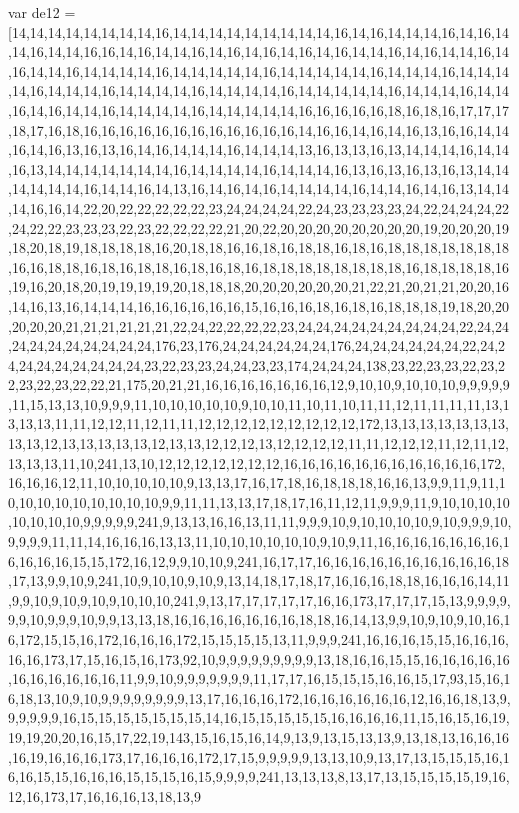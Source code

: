 var de12 = [14,14,14,14,14,14,14,14,16,14,14,14,14,14,14,14,14,14,16,14,16,14,14,14,16,14,16,14,14,16,14,14,16,16,14,16,14,14,16,14,16,14,16,14,16,14,16,14,14,16,14,16,14,14,16,14,16,14,14,16,14,14,14,14,16,14,14,14,14,14,16,14,14,14,14,14,16,14,14,14,16,14,14,14,14,16,14,14,14,16,14,14,14,14,16,14,14,14,14,16,14,14,14,14,14,16,14,14,14,16,14,14,16,14,16,14,14,16,14,14,14,14,16,14,14,14,14,14,16,16,16,16,16,18,16,18,16,17,17,17,18,17,16,18,16,16,16,16,16,16,16,16,16,16,16,16,14,16,16,14,16,14,16,13,16,16,14,14,16,14,16,13,16,13,16,14,16,14,14,14,16,14,14,14,13,16,13,13,16,13,14,14,14,16,14,14,16,13,14,14,14,14,14,14,14,16,14,14,14,14,16,14,14,14,16,13,16,13,16,13,16,13,14,14,14,14,14,14,16,14,14,16,14,13,16,14,16,14,16,14,14,14,14,16,14,14,16,14,16,13,14,14,14,16,16,14,22,20,22,22,22,22,22,23,24,24,24,24,22,24,23,23,23,23,24,22,24,24,24,22,24,22,22,23,23,23,22,23,22,22,22,22,21,20,22,20,20,20,20,20,20,20,20,19,20,20,20,19,18,20,18,19,18,18,18,18,16,20,18,18,16,16,18,16,18,18,16,18,16,18,18,18,18,18,18,18,16,16,18,18,16,18,16,18,18,16,18,16,18,16,18,18,18,18,18,18,18,18,16,18,18,18,18,16,19,16,20,18,20,19,19,19,19,20,18,18,18,20,20,20,20,20,20,21,22,21,20,21,21,20,20,16,14,16,13,16,14,14,14,16,16,16,16,16,16,15,16,16,16,18,16,18,16,18,18,18,19,18,20,20,20,20,20,21,21,21,21,21,21,22,24,22,22,22,22,23,24,24,24,24,24,24,24,24,24,22,24,24,24,24,24,24,24,24,24,24,176,23,176,24,24,24,24,24,24,176,24,24,24,24,24,24,22,24,24,24,24,24,24,24,24,24,23,22,23,23,24,24,23,23,174,24,24,24,138,23,22,23,23,22,23,22,23,22,23,22,22,21,175,20,21,21,16,16,16,16,16,16,16,12,9,10,10,9,10,10,10,9,9,9,9,9,11,15,13,13,10,9,9,9,11,10,10,10,10,10,9,10,10,11,10,11,10,11,11,12,11,11,11,11,13,13,13,13,11,11,12,12,11,12,11,11,12,12,12,12,12,12,12,12,12,172,13,13,13,13,13,13,13,13,13,12,13,13,13,13,13,12,13,13,12,12,12,13,12,12,12,12,11,11,12,12,12,11,12,11,12,13,13,13,11,10,241,13,10,12,12,12,12,12,12,12,16,16,16,16,16,16,16,16,16,16,16,172,16,16,16,12,11,10,10,10,10,10,9,13,13,17,16,17,18,16,18,18,18,16,16,13,9,9,11,9,11,10,10,10,10,10,10,10,10,10,9,9,11,11,13,13,17,18,17,16,11,12,11,9,9,9,11,9,10,10,10,10,10,10,10,10,9,9,9,9,9,241,9,13,13,16,16,13,11,11,9,9,9,10,9,10,10,10,10,9,10,9,9,9,10,9,9,9,9,11,11,14,16,16,16,13,13,11,10,10,10,10,10,10,9,10,9,11,16,16,16,16,16,16,16,16,16,16,16,15,15,172,16,12,9,9,10,10,9,241,16,17,17,16,16,16,16,16,16,16,16,16,16,18,17,13,9,9,10,9,241,10,9,10,10,9,10,9,13,14,18,17,18,17,16,16,16,18,18,16,16,16,14,11,9,9,10,9,10,9,10,9,10,10,10,241,9,13,17,17,17,17,17,16,16,173,17,17,17,15,13,9,9,9,9,9,9,10,9,9,9,10,9,9,13,13,18,16,16,16,16,16,16,16,18,18,16,14,13,9,9,10,9,10,9,10,16,16,172,15,15,16,172,16,16,16,172,15,15,15,15,13,11,9,9,9,241,16,16,16,15,15,16,16,16,16,16,173,17,15,16,15,16,173,92,10,9,9,9,9,9,9,9,9,9,13,18,16,16,15,15,16,16,16,16,16,16,16,16,16,16,16,11,9,9,10,9,9,9,9,9,9,9,11,17,17,16,15,15,15,16,16,15,17,93,15,16,16,18,13,10,9,10,9,9,9,9,9,9,9,9,13,17,16,16,16,172,16,16,16,16,16,16,12,16,16,18,13,9,9,9,9,9,9,16,15,15,15,15,15,15,15,14,16,15,15,15,15,15,16,16,16,16,11,15,16,15,16,19,19,19,20,20,16,15,17,22,19,143,15,16,15,16,14,9,13,9,13,15,13,13,9,13,18,13,16,16,16,16,19,16,16,16,173,17,16,16,16,172,17,15,9,9,9,9,9,13,13,10,9,13,17,13,15,15,15,16,16,16,15,15,16,16,16,15,15,15,16,15,9,9,9,9,241,13,13,13,8,13,17,13,15,15,15,15,19,16,12,16,173,17,16,16,16,13,18,13,9